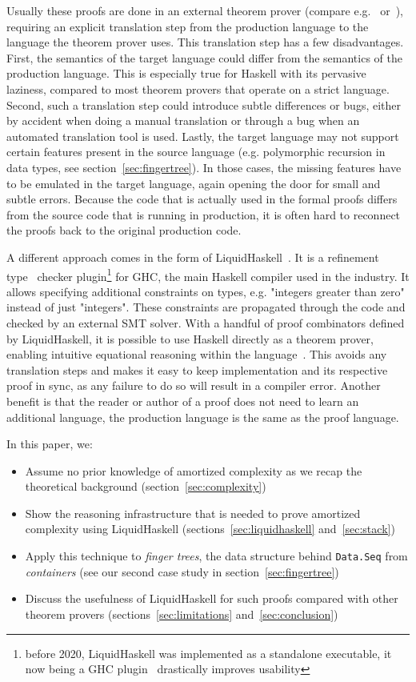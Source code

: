\documentclass[sigplan,screen]{acmart}
\begin{document}
Usually these proofs are done in an external theorem prover (compare e.g.~\cite{complexity_coq} or~\cite{complexity_isabelle}), requiring an explicit translation step from the production language to the language the theorem prover uses. This translation step has a few disadvantages. First, the semantics of the target language could differ from the semantics of the production language. This is especially true for Haskell with its pervasive laziness, compared to most theorem provers that operate on a strict language. Second, such a translation step could introduce subtle differences or bugs, either by accident when doing a manual translation or through a bug when an automated translation tool is used. Lastly, the target language may not support certain features present in the source language (e.g. polymorphic recursion in data types, see section~\ref{sec:fingertree}). In those cases, the missing features have to be emulated in the target language, again opening the door for small and subtle errors. Because the code that is actually used in the formal proofs differs from the source code that is running in production, it is often hard to reconnect the proofs back to the original production code.

A different approach comes in the form of LiquidHaskell~\cite{liquidhaskell}. It is a refinement type~\cite{refinement_types} checker plugin\footnote{before 2020, LiquidHaskell was implemented as a standalone executable, it now being a GHC plugin~\cite{lh_plugin} drastically improves usability} for GHC, the main Haskell compiler used in the industry. It allows specifying additional constraints on types, e.g. "integers greater than zero" instead of just "integers". These constraints are propagated through the code and checked by an external SMT solver. With a handful of proof combinators defined by LiquidHaskell, it is possible to use Haskell directly as a theorem prover, enabling intuitive equational reasoning within the language~\cite{tpfa}. This avoids any translation steps and makes it easy to keep implementation and its respective proof in sync, as any failure to do so will result in a compiler error. Another benefit is that the reader or author of a proof does not need to learn an additional language, the production language is the same as the proof language.

In this paper, we:
\begin{itemize}
\item{Assume no prior knowledge of amortized complexity as we recap the theoretical background (section~\ref{sec:complexity})}
\item{Show the reasoning infrastructure that is needed to prove amortized complexity using LiquidHaskell (sections~\ref{sec:liquidhaskell} and~\ref{sec:stack})}
\item{Apply this technique to \textit{finger trees}, the data structure behind \texttt{Data.Seq} from \textit{containers} (see our second case study in section~\ref{sec:fingertree})}
\item{Discuss the usefulness of LiquidHaskell for such proofs compared with other theorem provers (sections~\ref{sec:limitations} and~\ref{sec:conclusion})}
\end{itemize}
\end{document}
